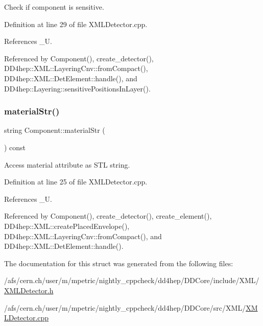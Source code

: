 Check if component is sensitive. 



Definition at line 29 of file X\+M\+L\+Detector.\+cpp.



References \+\_\+U.



Referenced by Component(), create\+\_\+detector(), D\+D4hep\+::\+X\+M\+L\+::\+Layering\+Cnv\+::from\+Compact(), D\+D4hep\+::\+X\+M\+L\+::\+Det\+Element\+::handle(), and D\+D4hep\+::\+Layering\+::sensitive\+Positions\+In\+Layer().

\hypertarget{struct_d_d4hep_1_1_x_m_l_1_1_component_adf36187cb8fe18edc8e8d208c41fe69e}{}\label{struct_d_d4hep_1_1_x_m_l_1_1_component_adf36187cb8fe18edc8e8d208c41fe69e} 
\subsubsection{\texorpdfstring{material\+Str()}{materialStr()}}
{\footnotesize\ttfamily string Component\+::material\+Str (\begin{DoxyParamCaption}{ }\end{DoxyParamCaption}) const}



Access material attribute as S\+TL string. 



Definition at line 25 of file X\+M\+L\+Detector.\+cpp.



References \+\_\+U.



Referenced by Component(), create\+\_\+detector(), create\+\_\+element(), D\+D4hep\+::\+X\+M\+L\+::create\+Placed\+Envelope(), D\+D4hep\+::\+X\+M\+L\+::\+Layering\+Cnv\+::from\+Compact(), and D\+D4hep\+::\+X\+M\+L\+::\+Det\+Element\+::handle().



The documentation for this struct was generated from the following files\+:\begin{DoxyCompactItemize}
\item 
/afs/cern.\+ch/user/m/mpetric/nightly\+\_\+cppcheck/dd4hep/\+D\+D\+Core/include/\+X\+M\+L/\hyperlink{_x_m_l_detector_8h}{X\+M\+L\+Detector.\+h}\item 
/afs/cern.\+ch/user/m/mpetric/nightly\+\_\+cppcheck/dd4hep/\+D\+D\+Core/src/\+X\+M\+L/\hyperlink{_x_m_l_detector_8cpp}{X\+M\+L\+Detector.\+cpp}\end{DoxyCompactItemize}
